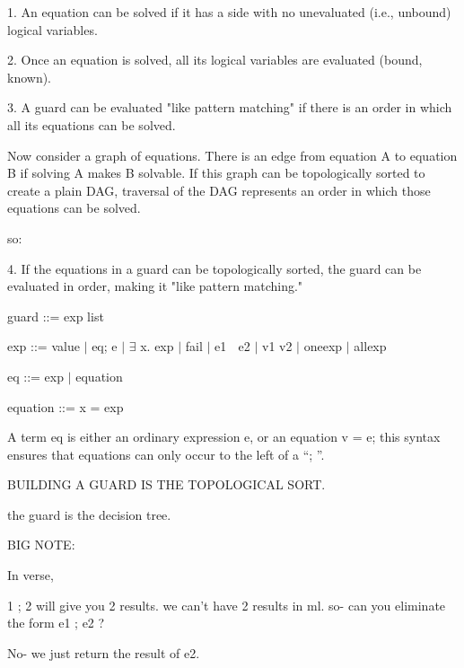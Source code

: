 \documentclass{article}
\begin{document}
1. An equation can be solved if it has a side with no unevaluated (i.e.,
unbound) logical variables. 

2. Once an equation is solved, all its logical variables are evaluated (bound,
known). 

3. A guard can be evaluated "like pattern matching" if there is an order in
which all its equations can be solved. 

Now consider a graph of equations.  There is an edge from
equation A to equation B if solving A makes B solvable.  If this graph can 
be topologically sorted to create a plain DAG, traversal of the DAG represents
an order in which those equations can be solved. 

so: 

4. If the equations in a guard can be topologically sorted, the guard can be 
   evaluated in order, making it "like pattern matching." 

guard ::= exp list 

exp ::= value $\vert$ eq; e $\vert$ $\exists$ x. exp $\vert$ fail $\vert$ e1
\choice $\;$ e2 $\vert$ v1 v2 $\vert$ one{exp} $\vert$ all{exp}

eq ::= exp $\vert$ equation 

equation ::= x = exp 


A term eq is either an ordinary expression e, or an equation v = e; this syntax
ensures that equations can only occur to the left of a “; ”. 


BUILDING A GUARD IS THE TOPOLOGICAL SORT. 

the guard is the decision tree. 

BIG NOTE: 

In verse, 

1 ; 2 will give you 2 results. we can't have 2 results in ml. 
so- can you eliminate the form e1 ; e2 ? 

No- we just return the result of e2. 

\end{document}
